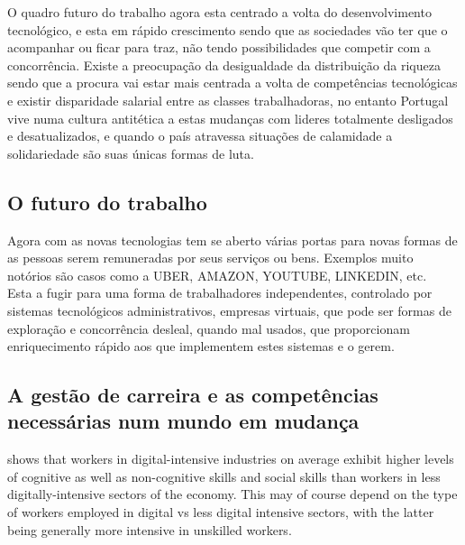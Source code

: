 O quadro futuro do trabalho agora esta centrado a volta do desenvolvimento tecnológico, e esta em rápido crescimento sendo que as sociedades vão ter que o acompanhar ou ficar para traz, não tendo possibilidades que competir com a concorrência. Existe a preocupação da desigualdade da distribuição da riqueza sendo que a procura vai estar mais centrada a volta de competências tecnológicas e existir disparidade salarial entre as classes trabalhadoras, no entanto Portugal vive numa cultura antitética a estas mudanças com lideres totalmente desligados e desatualizados, e quando o país atravessa situações de calamidade a solidariedade são suas únicas formas de luta.
















\subsection{O futuro do trabalho}
\qquad Agora com as novas tecnologias tem se aberto várias portas para novas formas de as pessoas serem remuneradas por seus serviços ou bens. Exemplos muito notórios são casos como a UBER, AMAZON, YOUTUBE, LINKEDIN, etc.\\

Esta a fugir para uma forma de trabalhadores independentes, controlado por sistemas tecnológicos administrativos, empresas virtuais, que pode ser formas de exploração e concorrência desleal, quando mal usados, que proporcionam enriquecimento rápido aos que implementem estes sistemas e o gerem.



\subsection{A gestão de carreira e as competências necessárias num mundo em mudança}

shows that workers in digital-intensive industries on average exhibit higher levels of cognitive as well as non-cognitive skills and social skills than workers in less digitally-intensive sectors of the economy. This may of course depend on the type of workers employed in digital vs less digital intensive sectors, with the latter being generally more intensive in unskilled workers.\\

